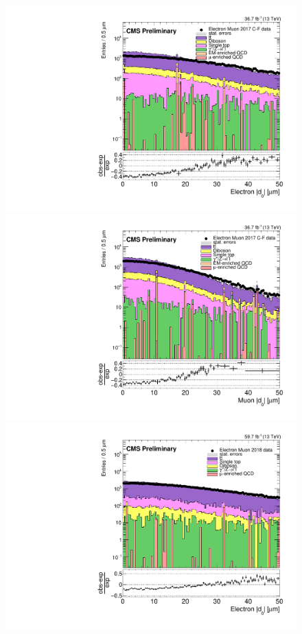 \begin{figure}[hbtp]
\centering
\includegraphics[scale=0.3]{figures/corrections/d0_smearing/emu_2017/electronAbsD0_50um_uncorrected.pdf} 
\includegraphics[scale=0.3]{figures/corrections/d0_smearing/emu_2017/muonAbsD0_50um_uncorrected.pdf}
\includegraphics[scale=0.3]{figures/corrections/d0_smearing/emu_2018/electronAbsD0_50um_uncorrected.pdf} 

\end{figure}
